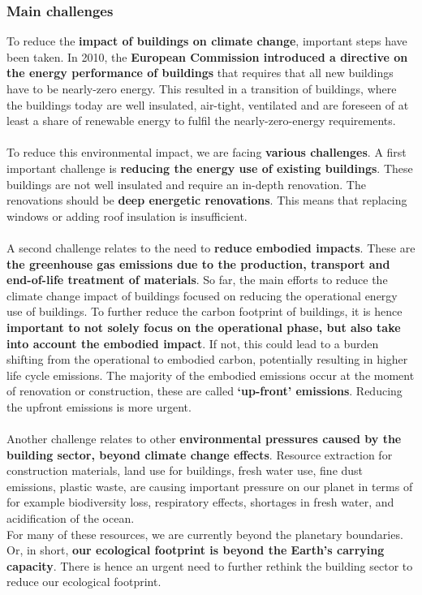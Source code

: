 \documentclass[../summary.tex]{subfiles}
\begin{document}
	\subsubsection{Main challenges}
	To reduce the \textbf{impact of buildings on climate change}, important steps have been taken. In 2010, the \textbf{European Commission introduced a directive on the energy performance of buildings} that requires that all new buildings have to be nearly-zero energy. This resulted in a transition of buildings, where the buildings today are well insulated, air-tight, ventilated and are foreseen of at least a share of renewable energy to fulfil the nearly-zero-energy requirements.
	\\\\
	To reduce this environmental impact, we are facing \textbf{various challenges}. A first important challenge is \textbf{reducing the energy use of existing buildings}. These buildings are not well insulated and require an in-depth renovation. The renovations should be \textbf{deep energetic renovations}. This means that replacing windows or adding roof insulation is insufficient.
	\\\\
	A second challenge relates to the need to \textbf{reduce embodied impacts}. These are \textbf{the greenhouse gas emissions due to the production, transport and end-of-life treatment of materials}. So far, the main efforts to reduce the climate change impact of buildings focused on reducing the operational energy use of buildings. To further reduce the carbon footprint of buildings, it is hence \textbf{important to not solely focus on the operational phase, but also take into account the embodied impact}. If not, this could lead to a burden shifting from the operational to embodied carbon, potentially resulting in higher life cycle emissions. The majority of the embodied emissions occur at the moment of renovation or construction, these are called \textbf{‘up-front’ emissions}. Reducing the upfront emissions is more urgent.
	\\\\
	Another challenge relates to other \textbf{environmental pressures caused by the building sector, beyond climate change effects}. Resource extraction for construction materials, land use for buildings, fresh water use, fine dust emissions, plastic waste, are causing important pressure on our planet in terms of for example biodiversity loss, respiratory effects, shortages in fresh water, and acidification of the ocean. 
	\\
	For many of these resources, we are currently beyond the planetary boundaries. Or, in short, \textbf{our ecological footprint is beyond the Earth’s carrying capacity}. There is hence an urgent need to further rethink the building sector to reduce our ecological footprint. 
	
\end{document}
